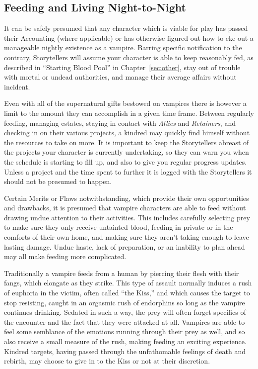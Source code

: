 \subsection{Feeding and Living Night-to-Night}
It can be safely presumed that any character which is viable for play has passed their 
Accounting (where applicable) or has otherwise figured out how to eke out a manageable 
nightly existence as a vampire.  Barring specific notification to the contrary, Storytellers 
will assume your character is able to keep reasonably fed, as described in ``Starting Blood 
Pool'' in Chapter~\ref{sec:other}, stay out of trouble with mortal or undead authorities, 
and manage their average affairs without incident.

Even with all of the supernatural gifts bestowed on vampires there is however a limit to the 
amount they can accomplish in a given time frame.  Between regularly feeding, managing estates, 
staying in contact with \emph{Allies} and \emph{Retainers}, and checking in on their various 
projects, a kindred may quickly find himself without the resources to take on more.  It is 
important to keep the Storytellers abreast of the projects your character is currently undertaking, 
so they can warn you when the schedule is starting to fill up, and also to give you regular 
progress updates.  Unless a project and the time spent to further it is logged with the Storytellers 
it should not be presumed to happen.

Certain Merits or Flaws notwithstanding, which provide their own opportunities and drawbacks, it 
is presumed that vampire characters are able to feed without drawing undue attention to their 
activities.  This includes carefully selecting prey to make sure they only receive untainted 
blood, feeding in private or in the comforts of their own home, and making sure they aren't taking 
enough to leave lasting damage.  Undue haste, lack of preparation, or an inability to plan ahead 
may all make feeding more complicated.

Traditionally a vampire feeds from a human by piercing their flesh with their fangs, which elongate 
as they strike.  This type of assault normally induces a rush of euphoria in the victim, often called 
``the Kiss,'' and which causes the target to stop resisting, caught in an orgasmic rush of endorphins 
so long as the vampire continues drinking.  Sedated in such a way, the prey will often forget specifics 
of the encounter and the fact that they were attacked at all.  Vampires are able to feel some semblance 
of the emotions running through their prey as well, and so also receive a small measure of the rush, making 
feeding an exciting experience.  Kindred targets, having passed through the unfathomable feelings of death 
and rebirth, may choose to give in to the Kiss or not at their discretion.  

